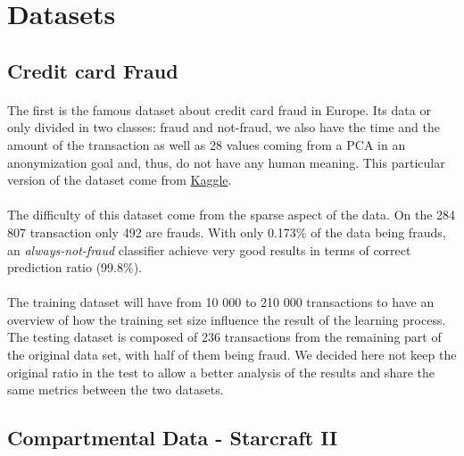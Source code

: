 \documentclass[twocolumn,a4paper,10pt]{article}
\begin{document}
\section{Datasets}

\subsection{Credit card Fraud}

\paragraph{}

The first is the famous dataset about credit card fraud in Europe.
Its data or only divided in two classes: fraud and not-fraud, we also
have the time and the amount of the transaction as well as 28 values
coming from a PCA in an anonymization goal and, thus, do not have
any human meaning. This particular version of the dataset come from
\href{https://www.kaggle.com/dalpozz/creditcardfraud/}{Kaggle}.

\paragraph{}

The difficulty of this dataset come from the sparse aspect of the
data. On the 284 807 transaction only 492 are frauds. With only 0.173\%
of the data being frauds, an \textit{always-not-fraud} classifier
achieve very good results in terms of correct prediction ratio (99.8\%).

\paragraph{}

The training dataset will have from 10 000 to 210 000 transactions
to have an overview of how the training set size influence the result
of the learning process. The testing dataset is composed of 236 transactions
from the remaining part of the original data set, with half of them being
fraud. We decided here not
keep the original ratio in the test to allow a better analysis of
the results and share the same metrics between the two datasets.

\subsection{Compartmental Data - Starcraft II}

\paragraph{}
\end{document}
